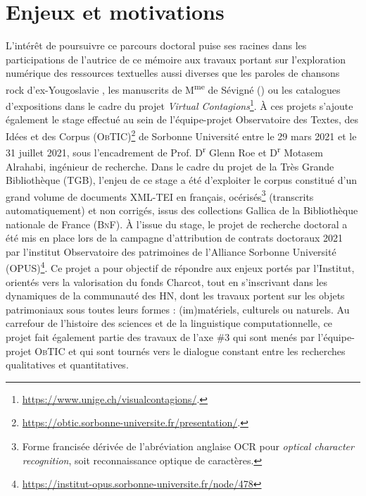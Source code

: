 \section{Enjeux et motivations}




L'intérêt de poursuivre ce parcours doctoral puise ses racines dans les participations de l'autrice de ce mémoire aux travaux portant sur l'exploration numérique des ressources textuelles aussi diverses que les paroles de chansons rock d'ex-Yougoslavie \citep{petkovic2019creation}, les manuscrits de M\textsuperscript{me} de Sévigné (\citealp{gabay2020quantifying,gabay2021katabase}) ou les catalogues d'expositions dans le cadre du projet \textit{Virtual Contagions}\footnote{\url{https://www.unige.ch/visualcontagions/}.}. 
À ces projets s'ajoute également le stage effectué au sein de l'équipe-projet Observatoire des Textes, des Idées et des Corpus (\textsc{ObTIC})\footnote{\url{https://obtic.sorbonne-universite.fr/presentation/}.} de Sorbonne Université entre le 29 mars 2021 et le 31 juillet 2021, sous l'encadrement de Prof. D\textsuperscript{r} Glenn Roe et D\textsuperscript{r} Motasem Alrahabi, ingénieur de recherche. Dans le cadre du projet de la Très Grande Bibliothèque (\textsc{TGB}), l'enjeu de ce stage a été d'exploiter le corpus constitué d'un grand volume de documents \textsc{XML-TEI} en français, océrisés\footnote{Forme francisée dérivée de l'abréviation anglaise \textsc{OCR} pour \textit{optical character recognition}, soit \og{}reconnaissance optique de caractères\fg{}.} (transcrits automatiquement) et non corrigés, issus des collections Gallica de la Bibliothèque nationale de France (\textsc{BnF}). 
À l'issue du stage, le projet de recherche doctoral a été mis en place lors de la campagne d'attribution de contrats doctoraux 2021 par l'institut Observatoire des patrimoines de l'Alliance Sorbonne Université (\textsc{OPUS})\footnote{\url{https://institut-opus.sorbonne-universite.fr/node/478}}. Ce projet a pour objectif de répondre aux enjeux portés par l'Institut, orientés vers la valorisation du fonds Charcot, tout en s'inscrivant dans les dynamiques de la communauté des \textsc{HN}, dont les travaux portent sur les objets patrimoniaux sous toutes leurs formes : (im)matériels, culturels ou naturels. Au carrefour de l'histoire des sciences et de la linguistique computationnelle, ce projet fait également partie des travaux de l'axe \#3 qui sont menés par l'équipe-projet \textsc{ObTIC} et qui sont tournés vers le dialogue constant entre les recherches qualitatives et quantitatives. 

